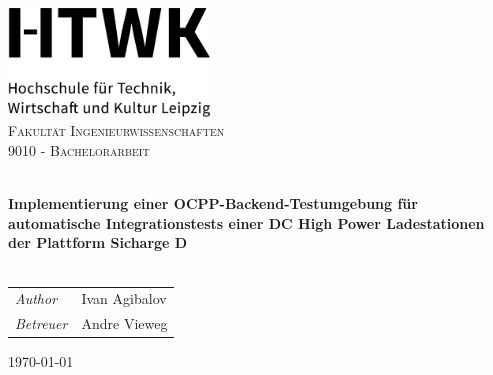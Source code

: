 \begin{titlepage}
    \vbox{}
    \vbox{}
    \begin{center}
        \includegraphics[width=0.40\textwidth,center]{Images/HTWK_Zusatz_de_V_Black.jpg}\\[1cm]
        \textsc{\LARGE Fakultät Ingenieurwissenschaften}\\[1.5cm]
        \textsc{\Large 9010 - Bachelorarbeit}\\[0.5cm]
        \vbox{ }

        \HRule \\[0.4cm]
        { \huge \bfseries Implementierung einer OCPP-Backend-Testumgebung für automatische 
        Integrationstests einer DC High Power Ladestationen der Plattform Sicharge D}\\[0.4cm]
        \HRule \\[1.5cm]

        \begin{table}[h]
            \large
                \centering
                \begin{tabular}{ll}
                    \emph{Author} & Ivan Agibalov \\
                    \emph{Betreuer} & Andre Vieweg
                \end{tabular}
            \end{table}
            \vfill
            {\large \today}
    \end{center}
\end{titlepage}
